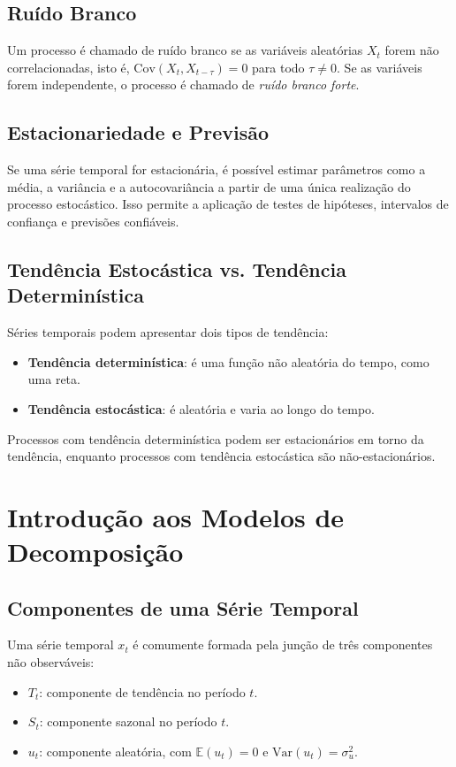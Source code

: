 \documentclass{sciposter}
\begin{document}
\begin{multicols}{3}
\subsection{Ruído Branco}
Um processo é chamado de ruído branco se as variáveis aleatórias $X_t$ forem não correlacionadas, isto é, $\text{Cov}(X_t, X_{t-\tau}) = 0$ para todo $\tau \neq 0$. Se as variáveis forem independente, o processo é chamado de \textit{ruído branco forte}.

\subsection{Estacionariedade e Previsão}
Se uma série temporal for estacionária, é possível estimar parâmetros como a média, a variância e a autocovariância a partir de uma única realização do processo estocástico. Isso permite a aplicação de testes de hipóteses, intervalos de confiança e previsões confiáveis.

\subsection{Tendência Estocástica vs. Tendência Determinística}
Séries temporais podem apresentar dois tipos de tendência:
\begin{itemize}
    \item \textbf{Tendência determinística}: é uma função não aleatória do tempo, como uma reta.
    \item \textbf{Tendência estocástica}: é aleatória e varia ao longo do tempo.
\end{itemize}
Processos com tendência determinística podem ser estacionários em torno da tendência, enquanto processos com tendência estocástica são não-estacionários.

\section{\textbf{Introdução aos Modelos de Decomposição}}

\subsection{Componentes de uma Série Temporal}
Uma série temporal $x_t$ é comumente formada pela junção de três componentes não observáveis:
\begin{itemize}
    \item $T_t$: componente de tendência no período $t$.
    \item $S_t$: componente sazonal no período $t$.
    \item $u_t$: componente aleatória, com $\mathbb{E}(u_t) = 0$ e $\text{Var}(u_t) = \sigma_u^2$.
\end{itemize}


\end{multicols}
\end{document}
